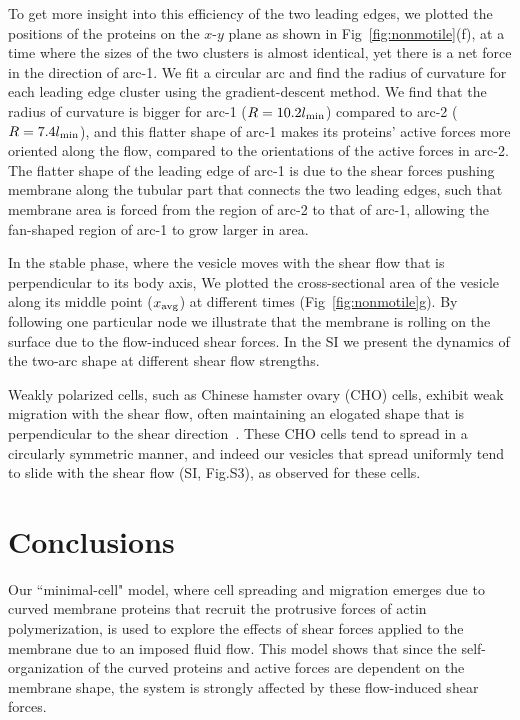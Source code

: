 \documentclass[
reprint,
superscriptaddress,
 amsmath,amssymb,
 aps,
prl,
floatfix]{revtex4-2}
\begin{document}
To get more insight into this efficiency of the two leading edges, we plotted the positions of the proteins on the $x$-$y$ plane as shown in Fig~\ref{fig:nonmotile}(f), at a time where the sizes of the two clusters is almost identical, yet there is a net force in the direction of arc-1. We fit a circular arc and find the radius of curvature for each leading edge cluster using the gradient-descent method. We find that the radius of curvature is bigger for arc-1 ($R=10.2l_{\rm min}$) compared to arc-2 ($R=7.4l_{\rm min}$), and this flatter shape of arc-1 makes its proteins' active forces more oriented along the flow, compared to the orientations of the active forces in arc-2. The flatter shape of the leading edge of arc-1 is due to the shear forces pushing membrane along the tubular part that connects the two leading edges, such that membrane area is forced from the region of arc-2 to that of arc-1, allowing the fan-shaped region of arc-1 to grow larger in area.

In the stable phase, where the vesicle moves with the shear flow that is perpendicular to its body axis, We plotted the cross-sectional area of the vesicle along its middle point ($x_{\rm avg}$) at different times (Fig~\ref{fig:nonmotile}g). By following one particular node we illustrate that the membrane is rolling on the surface due to the flow-induced shear forces. In the SI we present the dynamics of the two-arc shape at different shear flow strengths.


Weakly polarized cells, such as Chinese hamster ovary (CHO) cells, exhibit weak migration with the shear flow, often maintaining an elogated shape that is perpendicular to the shear direction~\cite{Dikeman2008}. These CHO cells tend to spread in a circularly symmetric manner, and indeed our vesicles that spread uniformly tend to slide with the shear flow (SI, Fig.S3), as observed for these cells.

\section{Conclusions}
Our ``minimal-cell" model, where cell spreading and migration emerges due to curved membrane proteins that recruit the protrusive forces of actin polymerization, is used to explore the effects of shear forces applied to the membrane due to an imposed fluid flow. This model shows that since the self-organization of the curved proteins and active forces are dependent on the membrane shape, the system is strongly affected by these flow-induced shear forces. 
\end{document}
